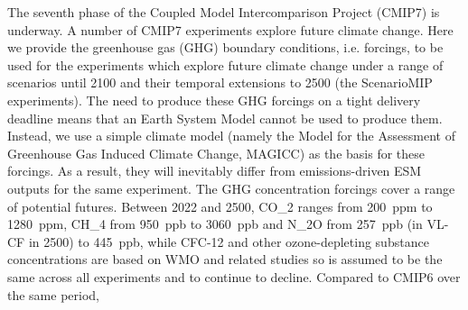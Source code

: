 The seventh phase of the Coupled Model Intercomparison Project (CMIP7) is underway.
A number of CMIP7 experiments explore future climate change.
Here we provide the greenhouse gas (GHG) boundary conditions, i.e. forcings,
to be used for the experiments which explore future climate change under a range of scenarios until 2100
and their temporal extensions to 2500 (the ScenarioMIP experiments).
The need to produce these GHG forcings on a tight delivery deadline means that an Earth System Model cannot be used to produce them.
Instead, we use a simple climate model (namely the Model for the Assessment of Greenhouse Gas Induced Climate Change, MAGICC) as the basis for these forcings.
As a result, they will inevitably differ from emissions-driven ESM outputs for the same experiment.
The GHG concentration forcings cover a range of potential futures.
Between 2022 and 2500,
CO_2 ranges from 200~ppm
to 1280~ppm,
CH_4 from 950~ppb
to 3060~ppb
and N_2O from 257~ppb
(in VL-CF in 2500)
to 445~ppb,
while CFC-12 and other ozone-depleting substance concentrations are based on WMO and related studies
so is assumed to be the same across all experiments and to continue to decline.
Compared to CMIP6 over the same period,
